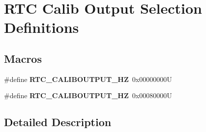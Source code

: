 \hypertarget{group___r_t_c_ex___calib___output__selection___definitions}{}\section{R\+TC Calib Output Selection Definitions}
\label{group___r_t_c_ex___calib___output__selection___definitions}
\subsection*{Macros}
\begin{DoxyCompactItemize}
\item 
\mbox{\label{group___r_t_c_ex___calib___output__selection___definitions_ga8647cd287c7dfe52f29793be07817bac}} 
\#define {\bfseries R\+T\+C\+\_\+\+C\+A\+L\+I\+B\+O\+U\+T\+P\+U\+T\+\_\+HZ}~0x00000000U
\item 
\mbox{\label{group___r_t_c_ex___calib___output__selection___definitions_gaf97fb10389fb13d16c2f2859f8d228c2}} 
\#define {\bfseries R\+T\+C\+\_\+\+C\+A\+L\+I\+B\+O\+U\+T\+P\+U\+T\+\_\+HZ}~0x00080000U
\end{DoxyCompactItemize}


\subsection{Detailed Description}
